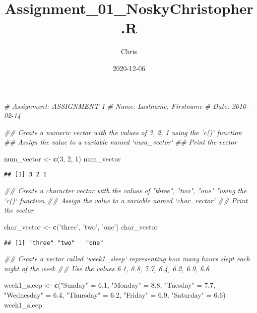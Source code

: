 \documentclass[
]{article}
\title{Assignment\_01\_NoskyChristopher.R}
\author{Chris}
\date{2020-12-06}
\newenvironment{Shaded}{\begin{snugshade}}{\end{snugshade}}
\newcommand{\CommentTok}[1]{\textcolor[rgb]{0.56,0.35,0.01}{\textit{#1}}}
\newcommand{\DecValTok}[1]{\textcolor[rgb]{0.00,0.00,0.81}{#1}}
\newcommand{\FloatTok}[1]{\textcolor[rgb]{0.00,0.00,0.81}{#1}}
\newcommand{\KeywordTok}[1]{\textcolor[rgb]{0.13,0.29,0.53}{\textbf{#1}}}
\newcommand{\NormalTok}[1]{#1}
\newcommand{\StringTok}[1]{\textcolor[rgb]{0.31,0.60,0.02}{#1}}
\begin{document}
\maketitle

\begin{Shaded}
\begin{Highlighting}[]
\CommentTok{# Assignment: ASSIGNMENT 1}
\CommentTok{# Name: Lastname, Firstname}
\CommentTok{# Date: 2010-02-14}

\CommentTok{## Create a numeric vector with the values of 3, 2, 1 using the `c()` function}
\CommentTok{## Assign the value to a variable named `num_vector`}
\CommentTok{## Print the vector}

\NormalTok{num_vector <-}\StringTok{ }\KeywordTok{c}\NormalTok{(}\DecValTok{3}\NormalTok{, }\DecValTok{2}\NormalTok{, }\DecValTok{1}\NormalTok{)}
\NormalTok{num_vector}
\end{Highlighting}
\end{Shaded}

\begin{verbatim}
## [1] 3 2 1
\end{verbatim}

\begin{Shaded}
\begin{Highlighting}[]
\CommentTok{## Create a character vector with the values of "three", "two", "one" "using the `c()` function}
\CommentTok{## Assign the value to a variable named `char_vector`}
\CommentTok{## Print the vector}

\NormalTok{char_vector <-}\StringTok{ }\KeywordTok{c}\NormalTok{(}\StringTok{'three'}\NormalTok{, }\StringTok{'two'}\NormalTok{, }\StringTok{'one'}\NormalTok{)}
\NormalTok{char_vector}
\end{Highlighting}
\end{Shaded}

\begin{verbatim}
## [1] "three" "two"   "one"
\end{verbatim}

\begin{Shaded}
\begin{Highlighting}[]
\CommentTok{## Create a vector called `week1_sleep` representing how many hours slept each night of the week}
\CommentTok{## Use the values 6.1, 8.8, 7.7, 6.4, 6.2, 6.9, 6.6}

\NormalTok{week1_sleep <-}\StringTok{ }\KeywordTok{c}\NormalTok{(}\StringTok{"Sunday"}\NormalTok{ =}\StringTok{ }\FloatTok{6.1}\NormalTok{, }\StringTok{"Monday"}\NormalTok{ =}\StringTok{ }\FloatTok{8.8}\NormalTok{, }\StringTok{"Tuesday"}\NormalTok{ =}\StringTok{ }\FloatTok{7.7}\NormalTok{, }
                 \StringTok{"Wednesday"}\NormalTok{ =}\StringTok{ }\FloatTok{6.4}\NormalTok{, }\StringTok{"Thursday"}\NormalTok{ =}\StringTok{ }\FloatTok{6.2}\NormalTok{, }\StringTok{"Friday"}\NormalTok{ =}\StringTok{ }\FloatTok{6.9}\NormalTok{,}
                 \StringTok{"Saturday"}\NormalTok{ =}\StringTok{ }\FloatTok{6.6}\NormalTok{)}
\NormalTok{week1_sleep}
\end{Highlighting}
\end{Shaded}
\end{document}
